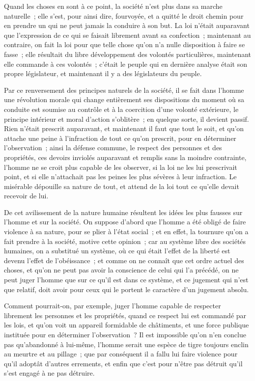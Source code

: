 \documentclass[french,twoside]{book} %
\begin{document}
Quand les choses en sont à ce point, la société n’est plus dans sa marche naturelle ; elle s’est, pour ainsi dire, fourvoyée, et a quitté le droit chemin pour en prendre un qui ne peut jamais la conduire à son but. La loi n’était auparavant que l’expression de ce qui se faisait librement avant sa confection ; maintenant au contraire, on fait la loi pour que telle chose qu’on n’a nulle disposition à faire se fasse ; elle résultait du libre développement des volontés particulières, maintenant elle commande à ces volontés ; c’était le peuple qui en dernière analyse était son propre législateur, et maintenant il y a des législateurs du peuple.\par
Par ce renversement des principes naturels de la société, il se fait dans l’homme une révolution morale qui change entièrement ses dispositions du moment où sa conduite est soumise au contrôle et à la coercition d’une volonté extérieure, le principe intérieur et moral d’action s’oblitère ; en quelque sorte, il devient passif. Rien n’était prescrit auparavant, et maintenant il faut que tout le soit, et qu’on attache une peine à l’infraction de tout ce qu’on prescrit, pour en déterminer l’observation ; ainsi la défense commune, le respect des personnes et des propriétés, ces devoirs inviolés auparavant et remplis sans la moindre contrainte, l’homme ne se croit plus capable de les observer, si la loi ne les lui prescrivait point, et si elle n’attachait pas les peines les plus sévères à leur infraction. Le misérable dépouille sa nature de tout, et attend de la loi tout ce qu’elle devait recevoir de lui.\par
De cet avilissement de la nature humaine résultent les idées les plus fausses sur l’homme et sur la société. On suppose d’abord que l’homme a été obligé de faire violence à sa nature, pour se plier à l’état social ; et en effet, la tournure qu’on a fait prendre à la société, motive cette opinion ; car au système libre des sociétés humaines, on a substitué un système, où ce qui était l’effet de la liberté est devenu l’effet de l’obéissance ; et comme on ne connaît que cet ordre actuel des choses, et qu’on ne peut pas avoir la conscience de celui qui l’a précédé, on ne peut juger l’homme que sur ce qu’il est dans ce système, et ce jugement qui n’est que relatif, doit avoir pour ceux qui le portent le caractère d’un jugement absolu.\par
Comment pourrait-on, par exemple, juger l’homme capable de respecter librement les personnes et les propriétés, quand ce respect lui est commandé par les lois, et qu’on voit un appareil formidable de châtiments, et une force publique instituée pour en déterminer l’observation ? Il est impossible qu’on n’en conclue pas qu’abandonné à lui-même, l’homme serait une espèce de tigre toujours enclin au meurtre et au pillage ; que par conséquent il a fallu lui faire violence pour qu’il adoptât d’autres errements, et enfin que c’est pour n’être pas détruit qu’il s’est engagé à ne pas détruire.\par
\end{document}
